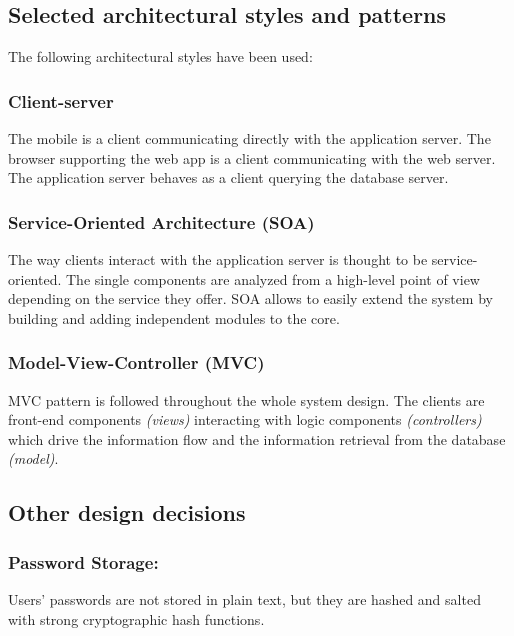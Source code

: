 \subsection{Selected architectural styles and patterns}

	The following architectural styles have been used:
	\subsubsection{Client-server}
	The mobile is a client
	communicating directly with the application server. The browser supporting the web
	app is a client communicating with the web server. The application server
	behaves as a client querying the database server.
	
	\subsubsection{Service-Oriented Architecture (SOA)}

	The way clients interact
	with the application server is thought to be service-oriented. The single components are analyzed from a high-level point of view depending on the service
	they offer. SOA allows to easily extend the system by building and adding independent modules to the core.
	
	\subsubsection{Model-View-Controller (MVC)}

	MVC pattern is followed throughout
	the whole system design. The clients are front-end components \textit{(views)} interacting with logic components \textit{(controllers)} which drive the information flow and
	the information retrieval from the database \textit{(model)}.
	
\subsection{Other design decisions}
	\subsubsection{Password Storage:}
	Users' passwords are not stored in plain text, but they are hashed and salted
	with strong cryptographic hash functions.